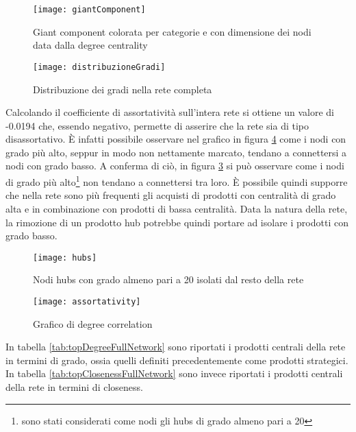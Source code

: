 \begin{figure}[]
    \texttt{[image: giantComponent]}\centering
    \caption{Giant component colorata per categorie e con dimensione dei nodi data dalla degree centrality}\label{fig:giantComponent}
\end{figure}

\begin{figure}[H]
    \texttt{[image: distribuzioneGradi]}\centering
    \caption{Distribuzione dei gradi nella rete completa}\label{fig:distribuzioneGradi}
\end{figure}

Calcolando il coefficiente di assortatività sull'intera rete si ottiene un valore di -0.0194 che, essendo negativo, permette di asserire che la rete sia di tipo disassortativo. È infatti possibile osservare nel grafico in figura \ref{fig:assortativity} come i nodi  con grado più alto, seppur in modo non nettamente marcato, tendano a connettersi a nodi con grado basso. A conferma di ciò, in figura \ref{fig:hubs} si può osservare come i nodi di grado più alto\footnote{sono stati considerati come nodi gli hubs di grado almeno pari a 20} non tendano a connettersi tra loro. È possibile quindi supporre che nella rete sono più frequenti gli acquisti di prodotti con centralità di grado alta e in combinazione con prodotti di bassa centralità. Data la natura della rete, la rimozione di un prodotto hub potrebbe quindi portare ad isolare i prodotti con grado basso. 

\begin{figure}[H]
    \texttt{[image: hubs]}\centering
    \caption{Nodi hubs con grado almeno pari a 20 isolati dal resto della rete}\label{fig:hubs}
\end{figure}

\begin{figure}[H]
    \texttt{[image: assortativity]}\centering
    \caption{Grafico di degree correlation}\label{fig:assortativity}
\end{figure}

In tabella \ref{tab:topDegreeFullNetwork} sono riportati i prodotti centrali della rete in termini di grado, ossia quelli definiti precedentemente come prodotti strategici. \\
In tabella \ref{tab:topClosenessFullNetwork} sono invece riportati i prodotti centrali della rete in termini di closeness. \\

